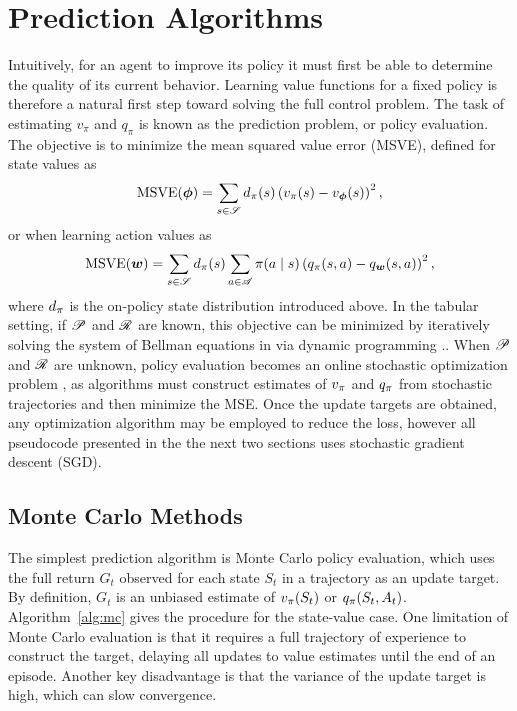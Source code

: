   \section{Prediction Algorithms} \label{sec:prediction}
  Intuitively, for an agent to improve its policy it must first be able to determine the quality of its current behavior. Learning value functions for a fixed policy is therefore a natural first step toward solving the full control problem. The task of estimating $v_\pi$ and $q_\pi$ is known as the prediction problem, or policy evaluation. The objective is to minimize the mean squared value error (MSVE), defined for state values as
  \begin{equation}
      \text{MSVE}({\bm \phi}) = \sum_{s \in \mathscr{S}} d_{\pi}(s) \left( v_{\pi}(s) - v_{\bm \phi}(s) \right)^2,
      \label{eq:msve_v}
  \end{equation}
  or when learning action values as
  \begin{equation}
      \text{MSVE}({\bm w}) = \sum_{s \in \mathscr{S}} d_{\pi}(s) \sum_{a \in \mathscr{A}} \pi(a \mid s) \left( q_{\pi}(s, a) - q_{\bm w}(s, a) \right)^2,
      \label{eq:msve_q}
  \end{equation}
  where $d_{\pi}$ is the on-policy state distribution introduced above.
  In the tabular setting, if $\mathscr{P}$ and $\mathscr{R}$ are known, this objective can be minimized by iteratively solving the system of Bellman equations in  via dynamic programming \cite{sutton1998introduction}.. When $\mathscr{P}$ and $\mathscr{R}$ are unknown, policy evaluation becomes an online stochastic optimization problem , as algorithms must construct estimates of $v_{\pi}$ and $q_{\pi}$ from stochastic trajectories and then minimize the MSE. Once the update targets are obtained, any optimization algorithm may be employed to reduce the loss, however all pseudocode presented in the the next two sections uses stochastic gradient descent (SGD). 
  
  \subsection{Monte Carlo Methods}
  The simplest prediction algorithm is Monte Carlo policy evaluation, which uses the full return $G_t$ observed for each state $S_t$ in a trajectory as an update target. By definition, $G_t$ is an unbiased estimate of $v_{\pi}(S_t)$ or $q_{\pi}(S_t, A_t)$. Algorithm~\ref{alg:mc} gives the procedure for the state-value case. One limitation of Monte Carlo evaluation is that it requires a full trajectory of experience to construct the target, delaying all updates to value estimates until the end of an episode. Another key disadvantage is that the variance of the update target is high, which can slow convergence.
  
